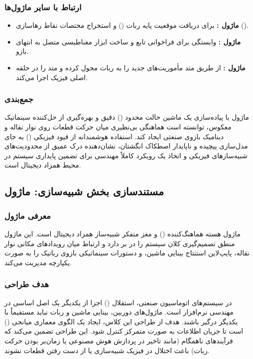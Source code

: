 \documentclass{article}
\begin{document}
\subsubsection{ارتباط با سایر ماژول‌ها}
\begin{itemize}
	\item \textbf{ماژول :} برای دریافت موقعیت پایه ربات () و استخراج مختصات نقاط رهاسازی ().
	\item \textbf{ماژول :} وابستگی برای فراخوانی تابع  و ساخت ابزار مغناطیسی متصل به انتهای بازو.
	\item \textbf{ماژول :} از طریق متد  مأموریت‌های جدید را به ربات محول کرده و متد  را در حلقه اصلی فیزیک اجرا می‌کند.
\end{itemize}

\subsubsection{جمع‌بندی}
ماژول  با پیاده‌سازی یک ماشین حالت محدود () دقیق و بهره‌گیری از حل‌کننده سینماتیک معکوس، توانسته است هماهنگی بی‌نظیری میان حرکت قطعات روی نوار نقاله و دینامیک بازوی صنعتی ایجاد کند. استفاده هوشمندانه از قیود فیزیکی () به جای مدل‌سازی پیچیده و ناپایدار اصطکاک انگشتان، نشان‌دهنده درک عمیق از محدودیت‌های شبیه‌سازهای فیزیکی و اتخاذ یک رویکرد کاملاً مهندسی برای تضمین پایداری سیستم در محیط همزاد دیجیتال است.

\subsection{مستندسازی بخش شبیه‌سازی: ماژول }

\subsubsection{معرفی ماژول}
ماژول  هسته هماهنگ‌کننده () و مغز متفکر شبیه‌ساز همزاد دیجیتال است. این ماژول منطق تصمیم‌گیری کلان سیستم را در بر دارد و ارتباط میان رویدادهای مکانی نوار نقاله، پایپ‌لاین استنتاج بینایی ماشین، و دستورات سینماتیکی بازوی رباتیک را به صورت یکپارچه مدیریت می‌کند.

\subsubsection{هدف طراحی}
در سیستم‌های اتوماسیون صنعتی، استقلال () اجزا از یکدیگر یک اصل اساسی در مهندسی نرم‌افزار است. ماژول‌های دوربین، بینایی ماشین و ربات نباید مستقیماً با یکدیگر درگیر باشند. هدف از طراحی این کلاس، ایجاد یک الگوی معماری میانجی () است تا جریان اطلاعات به صورت متمرکز کنترل شود. این طراحی تضمین می‌کند که فرآیندهای ناهمگام (مانند تاخیر در پردازش هوش مصنوعی یا زمان‌بر بودن حرکت ربات) باعث اختلال در فیزیک شبیه‌سازی یا از دست رفتن قطعات نشوند.
\end{document}
